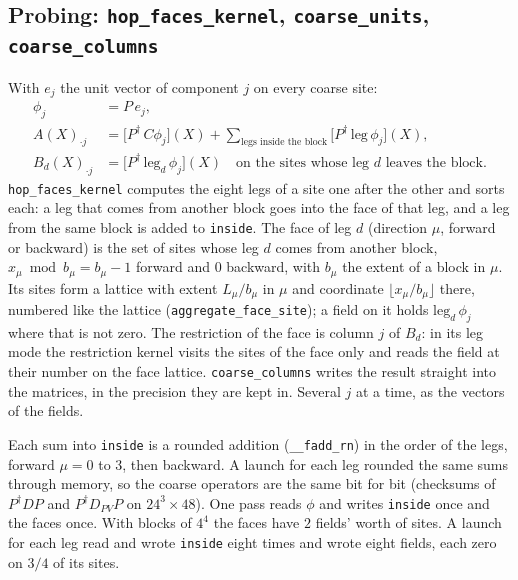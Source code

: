 \documentclass[11pt,a4paper]{article}
\numberwithin{equation}{section}
\newcommand{\code}[1]{\texttt{\small #1}}
\newcommand{\dg}{^{\dagger}}
\begin{document}
\subsection{Probing: \code{hop\_faces\_kernel}, \code{coarse\_units}, \code{coarse\_columns}}

With $e_j$ the unit vector of component $j$ on every coarse site:
\begin{align}
\phi_j &= P\,e_j,\\
A(X)_{\cdot j} &= \big[P\dg\,C\phi_j\big](X) + \sum_{\text{legs inside the block}}\big[P\dg\,\text{leg}\,\phi_j\big](X),\\
B_d(X)_{\cdot j} &= \big[P\dg\,\text{leg}_d\,\phi_j\big](X)\quad\text{on the sites whose leg }d\text{ leaves the block}.
\end{align}
\code{hop\_faces\_kernel} computes the eight legs of a site one after the other and sorts
each: a leg that comes from another block goes into the face of that leg, and a leg from the
same block is added to \code{inside}. The face of leg $d$ (direction $\mu$, forward or
backward) is the set of sites whose leg $d$ comes from another block, $x_\mu \bmod b_\mu = b_\mu-1$
forward and $0$ backward, with $b_\mu$ the extent of a block in $\mu$. Its sites form a lattice
with extent $L_\mu/b_\mu$ in $\mu$ and coordinate $\lfloor x_\mu/b_\mu\rfloor$ there, numbered
like the lattice (\code{aggregate\_face\_site}); a field on it holds $\text{leg}_d\,\phi_j$
where that is not zero. The restriction of the face is column $j$ of $B_d$: in its leg mode the
restriction kernel visits the sites of the face only and reads the field at their number on
the face lattice. \code{coarse\_columns} writes the result straight into the matrices, in the
precision they are kept in. Several $j$ at a time, as the vectors of the fields.

Each sum into \code{inside} is a rounded addition (\code{\_\_fadd\_rn}) in the order of the
legs, forward $\mu=0$ to $3$, then backward. A launch for each leg rounded the same sums
through memory, so the coarse operators are the same bit for bit (checksums of
$P\dg DP$ and $P\dg D_{PV}P$ on $24^3\times48$). One pass reads $\phi$ and writes
\code{inside} once and the faces once. With blocks of $4^4$ the faces have $2$ fields' worth of
sites. A launch for each leg read and wrote \code{inside} eight times and wrote eight fields,
each zero on $3/4$ of its sites.
\end{document}
